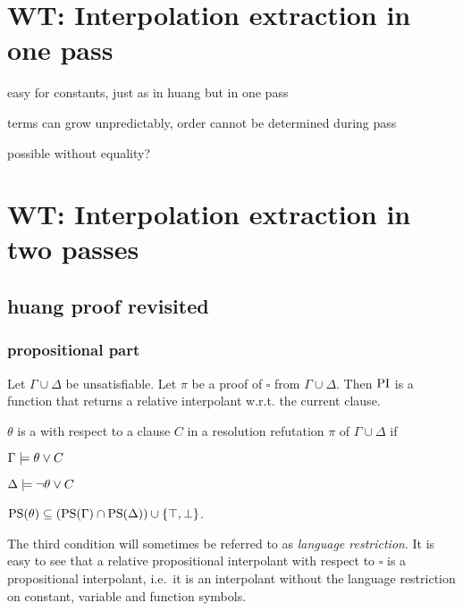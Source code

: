 \section{WT: Interpolation extraction in one pass}

easy for constants, just as in huang but in one pass

terms can grow unpredictably, order cannot be determined during pass

possible without equality?

\section{WT: Interpolation extraction in two passes}

\subsection{huang proof revisited}

\subsubsection{propositional part}

Let $\Gamma \cup \Delta$ be unsatisfiable. Let $\pi$ be a proof of $\square$ from $\Gamma \cup \Delta$. Then $\mathrm{PI}$ is a function that returns a relative interpolant w.r.t. the current clause. 

\begin{defi}
	$\theta$ is a  with respect to a clause $C$ in a resolution refutation $\pi$ of $\Gamma \cup \Delta$ if 
	\label{def:rel_prop_interpol}
	\begin{compactenum}
		\item $\Gamma \models \theta \lor C$
			\label{rel_prop_interpol_cond1}
		\item $\Delta \models \lnot \theta \lor C$
			\label{rel_prop_interpol_cond2}
		\item $\mathrm{PS}(\theta) \subseteq (\mathrm{PS}(\Gamma) \cap \mathrm{PS}(\Delta)) \cup \{\top, \bot\} $.
			\label{rel_prop_interpol_cond_lang}
			\qedhere
	\end{compactenum}
\end{defi}

The third condition will sometimes be referred to as \emph{language restriction}.
It is easy to see that a relative propositional interpolant with respect to $\square$ is a propositional interpolant, i.e.~it is an interpolant without the language restriction on constant, variable and function symbols.

